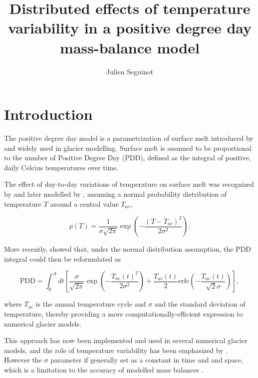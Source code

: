 \documentclass[twocolumn]{igs}
\begin{document}
\title[Temperature variability in a positive degree day model]{Distributed effects of temperature variability in a positive degree day mass-balance model}
\author[J. Seguinot]{Julien Seguinot}

\maketitle


\section{Introduction}

The positive degree day model is a parametrization of surface melt introduced by \citet{braithwaite-1984} and widely used in glacier modelling. Surface melt is assumed to be proportional to the number of Positive Degree Day (PDD), defined as the integral of positive, daily Celcius temperatures over time.

The effect of day-to-day variations of temperature on surface melt was recognized by \citet{braithwaite-1984} and later modelled by \citet{reeh-1991}, assuming a normal probability distribution of temperature $T$ around a central value $T_{ac}$,

\begin{equation}
  p(T) = \frac{1}{\sigma\sqrt{2\pi}}
    \exp\left({-\frac{(T-T_{ac})^2}{2\sigma^2}}\right).
\end{equation}

More recently, \citet{calov-greve-2005} showed that, under the normal distribution assumption, the PDD integral could then be reformulated as

\begin{equation}
  \mathrm{PDD} = \int_{0}^{A} dt \left[
    \frac{\sigma}{\sqrt{2\pi}}
    \exp\left({-\frac{T_{ac}(t)^2}{2\sigma^2}}\right)
    +\frac{T_{ac}(t)}{2}
    \mathrm{erfc} \left(-\frac{T_{ac}(t)}{\sqrt{2}\sigma}\right)
  \right],
\end{equation}

where $T_{ac}$ is the annual temperature cycle and $\sigma$ and the standard deviation of temperature, thereby providing a more computationally-efficient expression to numerical glacier models.

This approach has now been implemented and used in several numerical glacier models, and the role of temperature variability has been emphasized by \citet{charbit-etal-2012}. However the $\sigma$ parameter if generally set as a constant in time and and space, which is a limitation to the accuracy of modelled mass balances \citep{charbit-etal-2012}.
\end{document}
